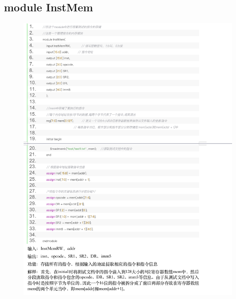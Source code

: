 \documentclass{article}
\begin{document}
\subsection{module InstMem}
\begin{figure}[H]
    \centering
    \includegraphics[width=1\textwidth]{pic/11.png}
  
    \end{figure}
\end{document}
